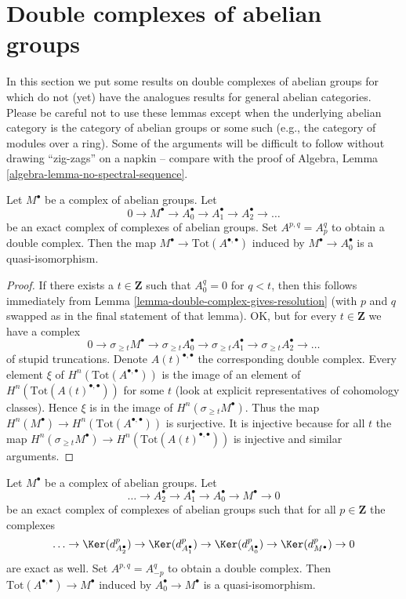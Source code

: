 \section{Double complexes of abelian groups}
\label{section-double-complexes-abelian-groups}

\noindent
In this section we put some results on double complexes of abelian groups
for which do not (yet) have the analogues results for general abelian
categories. Please be careful not to use these lemmas except when the
underlying abelian category is the category of abelian groups or some
such (e.g., the category of modules over a ring). Some of the arguments
will be difficult to follow without drawing ``zig-zags'' on a napkin --
compare with the proof of
Algebra, Lemma \ref{algebra-lemma-no-spectral-sequence}.

\begin{lemma}
\label{lemma-right-resolution-gives-qis}
Let $M^\bullet$ be a complex of abelian groups. Let
$$
0 \to M^\bullet \to A_0^\bullet \to A_1^\bullet \to A_2^\bullet \to \ldots
$$
be an exact complex of complexes of abelian groups. Set
$A^{p, q} = A_p^q$ to obtain a double complex.
Then the map $M^\bullet \to \text{Tot}(A^{\bullet, \bullet})$
induced by $M^\bullet \to A_0^\bullet$ is a quasi-isomorphism.
\end{lemma}

\begin{proof}
If there exists a $t \in \mathbf{Z}$ such that $A_0^q = 0$ for $q < t$, then
this follows immediately from
Lemma \ref{lemma-double-complex-gives-resolution}
(with $p$ and $q$ swapped as in the final statement of that lemma).
OK, but for every $t \in \mathbf{Z}$ we have a complex
$$
0 \to
\sigma_{\geq t}M^\bullet \to
\sigma_{\geq t}A_0^\bullet \to
\sigma_{\geq t}A_1^\bullet \to
\sigma_{\geq t}A_2^\bullet \to \ldots
$$
of stupid truncations. Denote $A(t)^{\bullet, \bullet}$ the corresponding
double complex. Every element $\xi$ of $H^n(\text{Tot}(A^{\bullet, \bullet}))$
is the image of an element of $H^n(\text{Tot}(A(t)^{\bullet, \bullet}))$
for some $t$ (look at explicit representatives of cohomology classes).
Hence $\xi$ is in the image of $H^n(\sigma_{\geq t}M^\bullet)$.
Thus the map $H^n(M^\bullet) \to H^n(\text{Tot}(A^{\bullet, \bullet}))$
is surjective. It is injective because for all $t$ the map
$H^n(\sigma_{\geq t}M^\bullet) \to H^n(\text{Tot}(A(t)^{\bullet, \bullet}))$
is injective and similar arguments.
\end{proof}

\begin{lemma}
\label{lemma-good-resolution-gives-qis}
Let $M^\bullet$ be a complex of abelian groups. Let
$$
\ldots \to A_2^\bullet \to A_1^\bullet \to A_0^\bullet \to M^\bullet \to 0
$$
be an exact complex of complexes of abelian groups such that for all
$p \in \mathbf{Z}$ the complexes
$$
\ldots \to \Ker(d_{A_2^\bullet}^p) \to \Ker(d_{A_1^\bullet}^p)
\to \Ker(d_{A_0^\bullet}^p) \to \Ker(d_{M^\bullet}^p) \to 0
$$
are exact as well. Set $A^{p, q} = A_{-p}^q$ to obtain a double
complex. Then $\text{Tot}(A^{\bullet, \bullet}) \to M^\bullet$
induced by $A_0^\bullet \to M^\bullet$ is a quasi-isomorphism.
\end{lemma}

